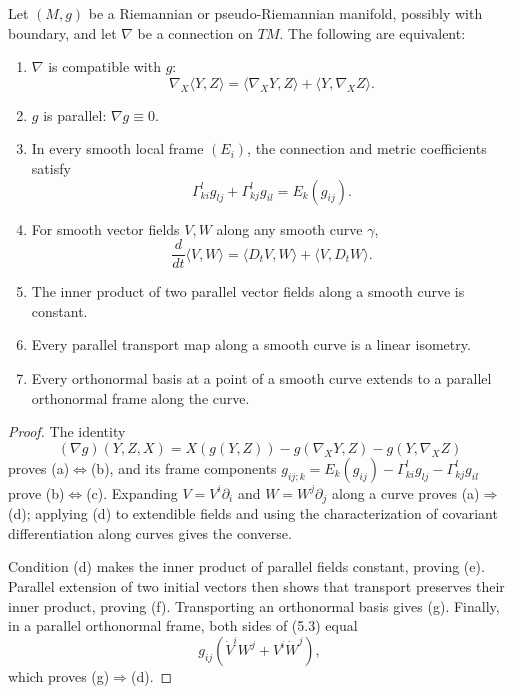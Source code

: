 \begin{proposition}
\label{prop:characterizations-of-metric-connections}

Let $(M,g)$ be a Riemannian or pseudo-Riemannian manifold, possibly with
boundary, and let $\nabla$ be a connection on $TM$. The following are
equivalent:
\begin{enumerate}
\item[(a)] $\nabla$ is compatible with $g$:
\[
\nabla_X\langle Y,Z\rangle
=\langle\nabla_XY,Z\rangle+\langle Y,\nabla_XZ\rangle.
\]
\item[(b)] $g$ is parallel: $\nabla g\equiv0$.
\item[(c)] In every smooth local frame $(E_i)$, the connection and metric
coefficients satisfy
\begin{equation}
\Gamma^l_{ki}g_{lj}+\Gamma^l_{kj}g_{il}=E_k(g_{ij}).
\tag{5.2}
\end{equation}
\item[(d)] For smooth vector fields $V,W$ along any smooth curve $\gamma$,
\begin{equation}
\frac d{dt}\langle V,W\rangle
=\langle D_tV,W\rangle+\langle V,D_tW\rangle.
\tag{5.3}
\end{equation}
\item[(e)] The inner product of two parallel vector fields along a smooth curve
is constant.
\item[(f)] Every parallel transport map along a smooth curve is a linear
isometry.
\item[(g)] Every orthonormal basis at a point of a smooth curve extends to a
parallel orthonormal frame along the curve.
\end{enumerate}

\begin{proof}
\sketch The identity
\[
(\nabla g)(Y,Z,X)
=X(g(Y,Z))-g(\nabla_XY,Z)-g(Y,\nabla_XZ)
\]
proves (a)$\Leftrightarrow$(b), and its frame components
$g_{ij;k}=E_k(g_{ij})-\Gamma^l_{ki}g_{lj}-\Gamma^l_{kj}g_{il}$ prove
(b)$\Leftrightarrow$(c). Expanding $V=V^i\partial_i$ and
$W=W^j\partial_j$ along a curve proves (a)$\Rightarrow$(d); applying (d) to
extendible fields and using the characterization of covariant differentiation
along curves gives the converse.

Condition (d) makes the inner product of parallel fields constant, proving
(e). Parallel extension of two initial vectors then shows that transport
preserves their inner product, proving (f). Transporting an orthonormal basis
gives (g). Finally, in a parallel orthonormal frame, both sides of (5.3) equal
\[
g_{ij}(\dot V^iW^j+V^i\dot W^j),
\]
which proves (g)$\Rightarrow$(d).
\end{proof}
\end{proposition}

